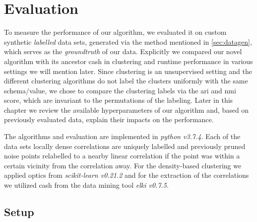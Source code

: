 \chapter{Evaluation}\label{ch:evaluation}
To measure the performance of our algorithm, we evaluated  it on custom synthetic \textit{labelled} data sets, generated via the method mentioned in \autoref{sec:datagen}, which serves as the \textit{groundtruth} of our data. Explicitly we compared our novel algorithm with its ancestor \gls{cash} in clustering and runtime performance in various settings we will mention later. Since clustering is an unsupervised setting and the different clustering algorithms do not label the clusters uniformly with the same schema/value, we chose to compare the clustering labels via the \gls{ari}\cite{hubert1985comparingari} and \gls{nmi}\cite{strehl2002clusternmi} score, which are invariant to the permutations of the labeling. Later in this chapter we review the available hyperparameters of our algorithm and, based on previously evaluated data, explain their impacts on the performance.

The algorithms and evaluation are implemented in \textit{python v3.7.4}. Each of the data sets locally dense correlations are uniquely labelled and previously pruned noise points relabelled to a nearby linear correlation if the point was within a certain vicinity from the correlation away. For the density-based clustering we applied \gls{optics} from \textit{scikit-learn v0.21.2}\cite{pedregosa2011scikit} and for the extraction of the correlations we utilized \gls{cash} from the data mining tool \textit{\gls{elki} v0.7.5}\cite{achtert2008elki}. 



\section{Setup}\label{sec:setup}

